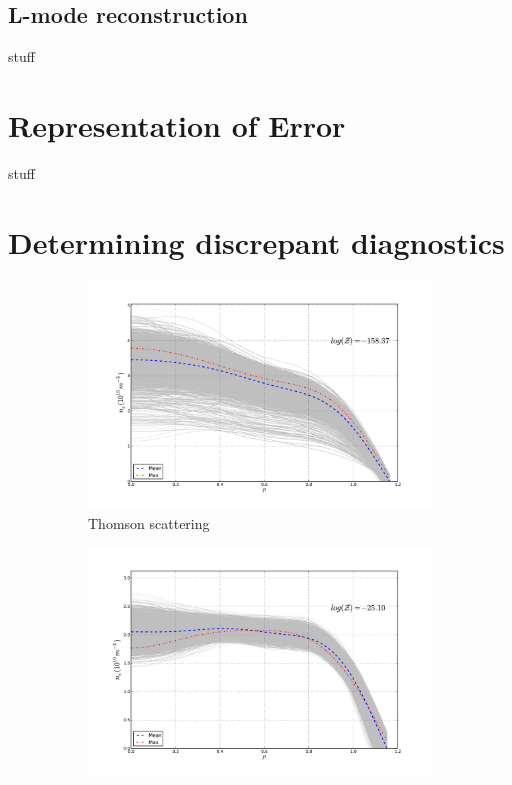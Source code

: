 \documentclass[12pt]{article}
\numberwithin{equation}{section}
\begin{document}
\subsection{L-mode reconstruction}
stuff
\section{Representation of Error}
stuff
\section{Determining discrepant diagnostics}
\begin{figure}[h]
	\centering
	\begin{subfigure}[b]{0.5\textwidth}
		\centering
		\includegraphics[width=\textwidth,keepaspectratio=true]{figures/bfit146102_00505_thom5}
		\vspace{-30pt}
		\caption{Thomson scattering}
		\label{fig:ts505}
	\end{subfigure}
	\hspace{-20pt}
	\begin{subfigure}[b]{0.5\textwidth}
		\centering
		\includegraphics[width=\textwidth,keepaspectratio=true]{figures/bfit146102_00505_inter5}

\end{subfigure}
\end{figure}
\end{document}
